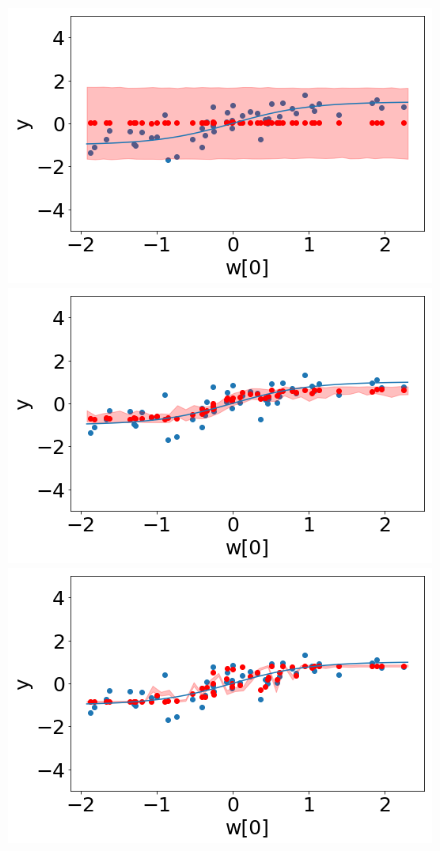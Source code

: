 \begin{figure}
 \begin{minipage}[]{.3\textwidth}
    \includegraphics[width=\textwidth]{plots/experiment_structures/plot_10kld.png}
\subcaption{}
\end{minipage}
 \begin{minipage}{.3\textwidth}
    \includegraphics[width=\textwidth]{plots/experiment_structures/plot_10elbo.png}
\subcaption{}
\end{minipage}
 \begin{minipage}{.3\textwidth}
    \includegraphics[width=\textwidth]{plots/experiment_structures/plot_10overfit.png}
\subcaption{}
\end{minipage}


\end{figure}
